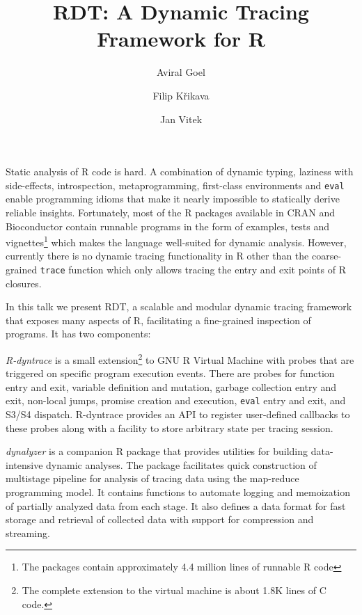 \documentclass[acmsmall,review]{acmart}
\title{RDT: A Dynamic Tracing Framework for R}
\author{Aviral Goel}
\affiliation{
  \institution{Northeastern University}
  \country{USA}
}
\author{Filip Křikava}
\affiliation{
  \institution{Czech Technical University}
  \country{Czechia}
}
\author{Jan Vitek}
\affiliation{
  \institution{Northeastern University}
  \country{USA}
}
\affiliation{
  \institution{Czech Technical University}
  \country{Czechia}
}
\newcommand{\code}[1]{\lstinline|#1|\xspace}
\newcommand{\RDT}{RDT\xspace}
\newcommand{\RDyntrace}{R-dyntrace\xspace}
\newcommand{\dynalyzer}{dynalyzer\xspace}
\begin{document}
\maketitle

\vspace{-1mm}

Static analysis of R code is hard. A combination of dynamic typing, laziness
with side-effects, introspection, metaprogramming, first-class environments and
\code{eval} enable programming idioms that make it nearly impossible to
statically derive reliable insights. Fortunately, most of the R packages
available in CRAN and Bioconductor contain runnable programs in the form of
examples, tests and vignettes\footnote{The packages contain approximately 4.4
million lines of runnable R code} which makes the language well-suited for
dynamic analysis.
%
However, currently there is no dynamic tracing functionality in R other than the
coarse-grained \code{trace} function which only allows tracing the entry and exit
points of R closures.

In this talk we present \RDT, a scalable and modular dynamic tracing framework
that exposes many aspects of R, facilitating a fine-grained inspection of
programs. It has two components:
%
\begin{compactitem}[$-$]
\item \emph{\RDyntrace} is a small extension\footnote{The complete extension to
    the virtual machine is about 1.8K lines of C code.} to GNU R Virtual Machine
  with probes that are triggered on specific program execution events. There are
  probes for function entry and exit, variable definition and mutation, garbage
  collection entry and exit, non-local jumps, promise creation and execution,
  \code{eval} entry and exit, and S3/S4 dispatch. \RDyntrace provides an API to
  register user-defined callbacks to these probes along with a facility to store
  arbitrary state per tracing session.
\item \emph{\dynalyzer} is a companion R package that provides utilities for
  building data-intensive dynamic analyses. The package facilitates quick
  construction of multistage pipeline for analysis of tracing data using the
  map-reduce programming model. It contains functions to automate logging and
  memoization of partially analyzed data from each stage. It also defines a
  data format for fast storage and retrieval of collected data with support for
  compression and streaming.
\end{compactitem}
\end{document}
